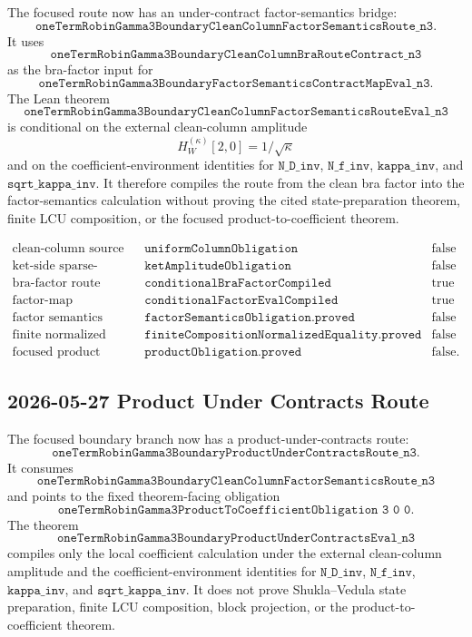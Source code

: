 The focused route now has an under-contract factor-semantics bridge:
\[
  \texttt{oneTermRobinGamma3BoundaryCleanColumnFactorSemanticsRoute\_n3}.
\]
It uses
\[
  \texttt{oneTermRobinGamma3BoundaryCleanColumnBraRouteContract\_n3}
\]
as the bra-factor input for
\[
  \texttt{oneTermRobinGamma3BoundaryFactorSemanticsContractMapEval\_n3}.
\]
The Lean theorem
\[
  \texttt{oneTermRobinGamma3BoundaryCleanColumnFactorSemanticsRouteEval\_n3}
\]
is conditional on the external clean-column amplitude
\[
  H_W^{(\kappa)}[2,0] = 1/\sqrt{\kappa}
\]
and on the coefficient-environment identities for
\(\texttt{N\_D\_inv}\), \(\texttt{N\_f\_inv}\),
\(\texttt{kappa\_inv}\), and \(\texttt{sqrt\_kappa\_inv}\).  It therefore
compiles the route from the clean bra factor into the factor-semantics
calculation without proving the cited state-preparation theorem, finite LCU
composition, or the focused product-to-coefficient theorem.

\[
\begin{array}{lll}
\text{clean-column source contract} & \texttt{uniformColumnObligation} & \text{false}\\
\text{ket-side sparse-register amplitude} & \texttt{ketAmplitudeObligation} & \text{false}\\
\text{bra-factor route} & \texttt{conditionalBraFactorCompiled} & \text{true}\\
\text{factor-map evaluation} & \texttt{conditionalFactorEvalCompiled} & \text{true}\\
\text{factor semantics} & \texttt{factorSemanticsObligation.proved} & \text{false}\\
\text{finite normalized block equality} & \texttt{finiteCompositionNormalizedEquality.proved} & \text{false}\\
\text{focused product theorem} & \texttt{productObligation.proved} & \text{false}.
\end{array}
\]

\subsection{2026-05-27 Product Under Contracts Route}

The focused boundary branch now has a product-under-contracts route:
\[
  \texttt{oneTermRobinGamma3BoundaryProductUnderContractsRoute\_n3}.
\]
It consumes
\[
  \texttt{oneTermRobinGamma3BoundaryCleanColumnFactorSemanticsRoute\_n3}
\]
and points to the fixed theorem-facing obligation
\[
  \texttt{oneTermRobinGamma3ProductToCoefficientObligation\ 3\ 0\ 0}.
\]
The theorem
\[
  \texttt{oneTermRobinGamma3BoundaryProductUnderContractsEval\_n3}
\]
compiles only the local coefficient calculation under the external
clean-column amplitude and the coefficient-environment identities for
\(\texttt{N\_D\_inv}\), \(\texttt{N\_f\_inv}\),
\(\texttt{kappa\_inv}\), and \(\texttt{sqrt\_kappa\_inv}\).  It does not
prove Shukla--Vedula state preparation, finite LCU composition, block
projection, or the product-to-coefficient theorem.

